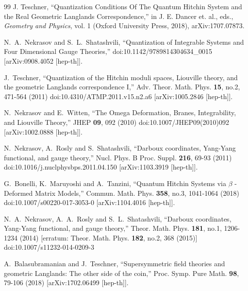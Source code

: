 \begin{thebibliography}{99}
J. Teschner, ``Quantization Conditions Of The Quantum Hitchin System and the Real Geometric Langlands Correspondence,'' in J. E. Dancer 
et. al., eds., {\it Geometry and Physics}, vol. 1 (Oxford University Press, 2018),
arXiv:1707.07873.



N.~A.~Nekrasov and S.~L.~Shatashvili,
``Quantization of Integrable Systems and Four Dimensional Gauge Theories,''
doi:10.1142/9789814304634\_0015
[arXiv:0908.4052 [hep-th]].

J.~Teschner,
``Quantization of the Hitchin moduli spaces, Liouville theory, and the geometric Langlands correspondence I,''
Adv. Theor. Math. Phys. \textbf{15}, no.2, 471-564 (2011)
doi:10.4310/ATMP.2011.v15.n2.a6
[arXiv:1005.2846 [hep-th]].


N.~Nekrasov and E.~Witten,
``The Omega Deformation, Branes, Integrability, and Liouville Theory,''
JHEP \textbf{09}, 092 (2010)
doi:10.1007/JHEP09(2010)092
[arXiv:1002.0888 [hep-th]].



N.~Nekrasov, A.~Rosly and S.~Shatashvili,
``Darboux coordinates, Yang-Yang functional, and gauge theory,''
Nucl. Phys. B Proc. Suppl. \textbf{216}, 69-93 (2011)
doi:10.1016/j.nuclphysbps.2011.04.150
[arXiv:1103.3919 [hep-th]].


G.~Bonelli, K.~Maruyoshi and A.~Tanzini,
``Quantum Hitchin Systems via ${\beta}$ -Deformed Matrix Models,''
Commun. Math. Phys. \textbf{358}, no.3, 1041-1064 (2018)
doi:10.1007/s00220-017-3053-0
[arXiv:1104.4016 [hep-th]].


N.~A.~Nekrasov, A.~A.~Rosly and S.~L.~Shatashvili,
``Darboux coordinates, Yang-Yang functional, and gauge theory,''
Theor. Math. Phys. \textbf{181}, no.1, 1206-1234 (2014)
[erratum: Theor. Math. Phys. \textbf{182}, no.2, 368 (2015)]
doi:10.1007/s11232-014-0209-3


A.~Balasubramanian and J.~Teschner,
``Supersymmetric field theories and geometric Langlands: The other side of the coin,''
Proc. Symp. Pure Math. \textbf{98}, 79-106 (2018)
[arXiv:1702.06499 [hep-th]].



\end{thebibliography}
